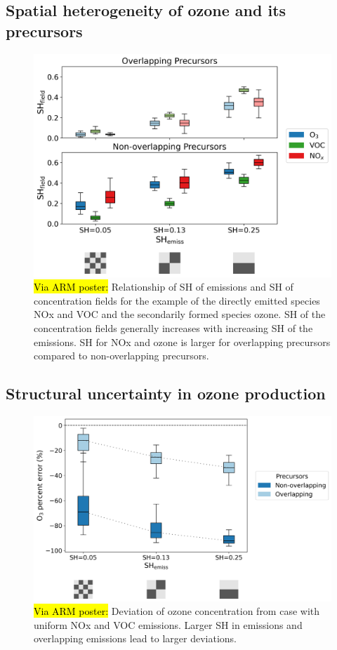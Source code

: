 \subsection{Spatial heterogeneity of ozone and its precursors}

\begin{figure}[h]
    \centering
    \includegraphics[width=\textwidth]{figures/field-SH-vs-emiss-SH-two-rows.png}
    \caption{\hl{Via ARM poster:} Relationship of SH of emissions and SH of concentration fields for the example of the directly emitted species NOx and VOC and the secondarily formed species ozone. SH of the concentration fields generally increases with increasing SH of the emissions. SH for NOx and ozone is larger for overlapping precursors compared to non-overlapping precursors.}
  \end{figure}

\subsection{Structural uncertainty in ozone production}

\begin{figure}[h]
    \centering
    \includegraphics[width=\textwidth]{figures/O3-percent-err-vs-emiss-SH.png}
    \caption{\hl{Via ARM poster:} Deviation of ozone concentration from case with uniform NOx and VOC emissions. Larger SH in emissions and overlapping emissions lead to larger deviations.}
  \end{figure}
  
